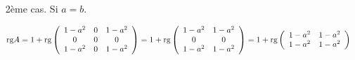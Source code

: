 {{\begin{enumerate}
\begin{itemize}
\begin{align*}\ensuremath
\mbox{rg}A&=1+\mbox{rg}\left(
\begin{array}{ccc}
1-a^2&b-a&1-ab\\
b-a&0&a-b\\
1-ab&a-b&1-b^2
\end{array}
\right)=1+\mbox{rg}\left(
\begin{array}{ccc}
1-a^2&1&1-ab\\
1&0&-1\\
1-ab&-1&1-b^2
\end{array}
\right)
\\
 &=1+\mbox{rg}\left(
\begin{array}{ccc}
1&0&-1\\
1-a^2&1&1-ab\\
1-ab&-1&1-b^2
\end{array}
\right)\quad(\mbox{rg}(L_1,L_2,L_3)=\mbox{rg}(L_2,L_1,L_3)).
\\
 &=1+\mbox{rg}\left(
\begin{array}{ccc}
1&0&0\\
1-a^2&1&2-a^2-ab\\
1-ab&-1&2-b^2-ab
\end{array}
\right)=1+\mbox{rg}\left(
\begin{array}{ccc}
1&0&0\\
1-a^2&1&0\\
1-ab&-1&(2-b^2-ab)-(2-a^2-ab)
\end{array}
\right)
\\
 &=1+\mbox{rg}\left(
\begin{array}{ccc}
1&0&0\\
1-a^2&1&0\\
1-ab&-1&(a-b)(a+b)
\end{array}
\right)
\end{align*}
Si $|a|\neq|b|$, $\mbox{rg}A=4$ et si $a=-b\neq0$, $\mbox{rg}A=3$.

\item[2ème cas.] Si $a=b$.

\begin{align*}\ensuremath
\mbox{rg}A&=1+\mbox{rg}\left(
\begin{array}{ccc}
1-a^2&0&1-a^2\\
0&0&0\\
1-a^2&0&1-a^2
\end{array}
\right)=1+\mbox{rg}\left(
\begin{array}{cc}
1-a^2&1-a^2\\
0&0\\
1-a^2&1-a^2
\end{array}
\right)=1+\mbox{rg}\left(
\begin{array}{cc}
1-a^2&1-a^2\\
1-a^2&1-a^2
\end{array}
\right)
\end{align*}


\end{itemize}
\end{enumerate}}}
